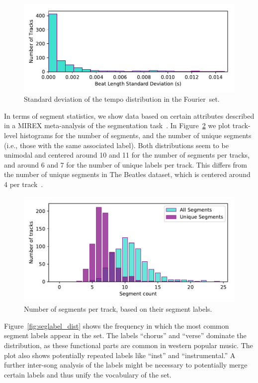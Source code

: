 \documentclass{article}
\newcommand{\setName}{Fourier}
\begin{document}
\begin{figure}
    \centerline{\includegraphics[width=\columnwidth]{figs/BPM_std.pdf}}
    \caption{Standard deviation of the tempo distribution in the \setName~set.}
    \label{fig:BPM_std}
\end{figure}

In terms of segment statistics, we show data based on certain attributes described in a MIREX meta-analysis of the segmentation task~\cite{Smith2013}.
In Figure~\ref{fig:segment_count} we plot track-level histograms for the number of segments, and the number of unique segments (i.e., those with the same associated label).
Both distributions seem to be unimodal and centered around 10 and 11 for the number of segments per tracks, and around 6 and 7 for the number of unique labels per track.
This differs from the number of unique segments in The Beatles dataset, which is centered around 4 per track~\cite{Nieto2014}.

\begin{figure}
    \centerline{\includegraphics[width=\columnwidth]{figs/segment_label_count.pdf}}
    \caption{Number of segments per track, based on their segment labels.}
    \label{fig:segment_count}
\end{figure}

Figure~\ref{fig:seglabel_dist} shows the frequency in which the most common segment labels appear in the set.
The labels ``chorus'' and ``verse'' dominate the distribution, as these functional parts are common in western popular music.
The plot also shows potentially repeated labels like ``inst'' and ``instrumental.''
A further inter-song analysis of the labels might be necessary to potentially merge certain labels and thus unify the vocabulary of the set.
\end{document}
